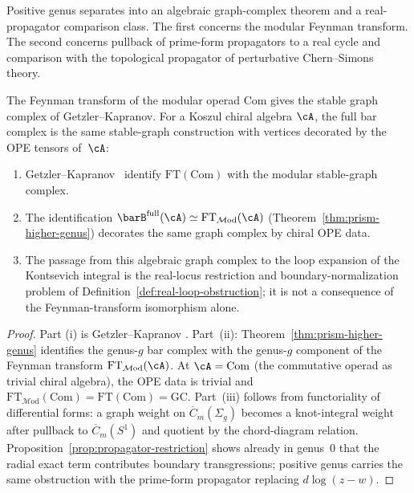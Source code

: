 Positive genus separates into an algebraic graph-complex theorem and a
real-propagator comparison class. The first concerns the modular Feynman
transform. The second concerns pullback of prime-form propagators to a real
cycle and comparison with the topological propagator of perturbative
Chern--Simons theory.

\begin{proposition}
\label{prop:feynman-graph-complex}
The Feynman transform of the modular operad $\mathrm{Com}$ gives the
stable graph complex of Getzler--Kapranov.  For a Koszul chiral
algebra $\cA$, the full bar complex is the same stable-graph
construction with vertices decorated by the OPE tensors of~$\cA$:
\begin{enumerate}[label=\textup{(\roman*)}]
\item Getzler--Kapranov~\cite[Theorem~5.4]{GeK98} identify
 $\mathrm{FT}(\mathrm{Com})$ with the modular stable-graph complex.
\item The identification
 $\barB^{\mathrm{full}}(\cA)
 \simeq \mathrm{FT}_{\mathcal{M}\mathrm{od}}(\cA)$
 (Theorem~\ref{thm:prism-higher-genus}) decorates the same graph
 complex by chiral OPE data.
\item The passage from this algebraic graph complex to the loop
 expansion of the Kontsevich integral is the real-locus restriction
 and boundary-normalization problem of
 Definition~\ref{def:real-loop-obstruction}; it is not a consequence
 of the Feynman-transform isomorphism alone.
\end{enumerate}
\end{proposition}

\begin{proof}
Part (i) is Getzler--Kapranov \cite[Theorem~5.4]{GeK98}. Part~(ii):
Theorem~\ref{thm:prism-higher-genus} identifies the genus-$g$ bar complex with
the genus-$g$ component of the Feynman transform
$\mathrm{FT}_{\mathcal{M}\mathrm{od}}(\cA)$. At $\cA = \mathrm{Com}$ (the
commutative operad as trivial chiral algebra), the OPE data is trivial and
$\mathrm{FT}_{\mathcal{M}\mathrm{od}}(\mathrm{Com}) =
\mathrm{FT}(\mathrm{Com}) = \mathrm{GC}$. Part~(iii) follows from
functoriality of differential forms: a graph weight on
$\overline{C}_{m}(\Sigma_g)$ becomes a knot-integral weight after pullback to
$\overline{C}_m(S^1)$ and quotient by the chord-diagram relation.
Proposition~\ref{prop:propagator-restriction} shows already in genus~$0$ that
the radial exact term contributes boundary transgressions; positive genus
carries the same obstruction with the prime-form propagator replacing
$d\log(z-w)$.
\end{proof}

